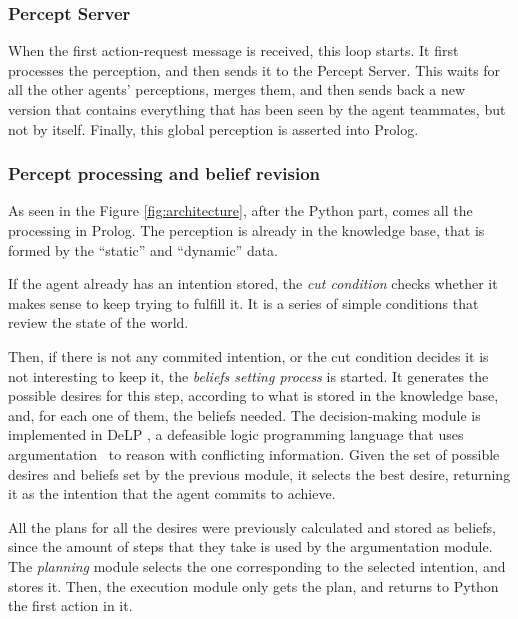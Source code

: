 
\subsubsection{Percept Server}
    When the first action-request message is received, this loop starts. It 
    first processes the perception, and then sends it to the Percept Server. 
    This waits for all the other agents' perceptions, merges them, and then sends 
    back a new version that contains everything that has been seen by the agent 
    teammates, but not by itself. Finally, this global perception is asserted 
    into Prolog. 


\subsubsection{Percept processing and belief revision}
    As seen in the Figure \ref{fig:architecture}, after the Python part, comes 
    all the processing in Prolog. The perception is already in the knowledge 
    base, that is formed by the ``static'' and ``dynamic'' data. 

    If the agent already has an intention stored, the \textit{cut condition}
    checks whether it makes sense to keep trying to fulfill it. It is a series
    of simple conditions that review the state of the world.

    Then, if there is not any commited intention, or the cut condition decides
    it is not interesting to keep it, the \textit{beliefs setting process} is
    started. It generates the possible desires for this step, according to what
    is stored in the knowledge base, and, for each one of them, the beliefs
    needed.  The decision-making module is implemented in
    DeLP\cite{Rotstein:2007} \cite{Ferretti:2008}, a defeasible logic
    programming language that uses argumentation \cite{DBLP:conf/comma/2008}\ to
    reason with conflicting information.  Given the set of possible desires and
    beliefs set by the previous module, it selects the best desire, returning it
    as the intention that the agent commits to achieve.

    All the plans for all the desires were previously calculated and stored as 
    beliefs, since the amount of steps that they take is used by the 
    argumentation module. The \textit{planning} module selects the one 
    corresponding to the selected intention, and stores it. Then, the 
    execution module only gets the plan, and returns to Python the first 
    action in it.

